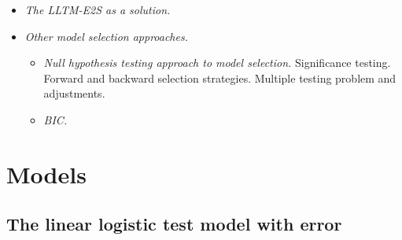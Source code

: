 \begin{itemize}
	\item \emph{The LLTM-E2S as a solution.}
	
	\item \emph{Other model selection approaches.}
		\begin{itemize}
			\item \emph{Null hypothesis testing approach to model selection.} Significance testing. Forward and backward selection strategies. Multiple testing problem and adjustments.
			\item \emph{BIC.}
		\end{itemize}
		
\end{itemize}


%


\section{Models}


\subsection{The linear logistic test model with error}

